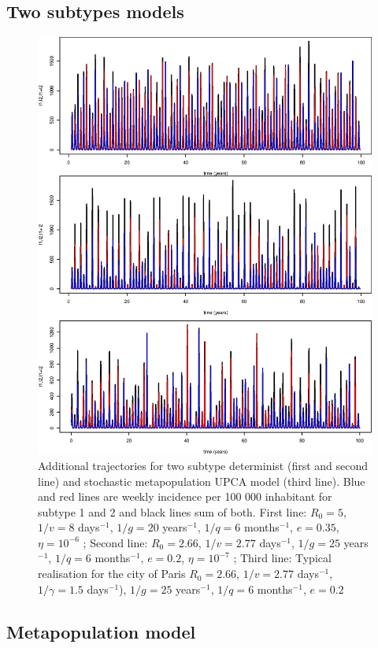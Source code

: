 \documentclass[12pt]{article}
\begin{document}
\clearpage

\subsection{Two subtypes models}

\begin{figure}[htb]
  \center
  \includegraphics[width= 0.8 \linewidth]{graph_annexe/2strain_traj100.eps}
  \caption{Additional trajectories for two subtype determinist
    (first and second line) and stochastic metapopulation UPCA model (third line). Blue and red lines
    are weekly incidence per 100 000 inhabitant for subtype 1 and 2
    and black lines sum of both.
    First line: $R_0=5$, $1/v=8$ days$^{-1}$, $1/g=20$ years$^{-1}$,
    $1/q=6$ months$^{-1}$, $e=0.35$, $\eta=10^{-6}$ ;
    Second line: $R_0=2.66$, $1/v=2.77$ days$^{-1}$, $1/g=25$
    years$^{-1}$, $1/q=6$ months$^{-1}$, $e=0.2$, $\eta=10^{-7}$ ;
    Third line: Typical realisation for the city of Paris $R_0=2.66$, $1/v=2.77$ days$^{-1}$, $1/ \gamma=1.5$
    days$^{-1}$),  $1/g=25$ years$^{-1}$, $1/q=6$ months$^{-1}$, $e=0.2$
  }
  \label{fig:2strain_traj100}
\end{figure}

\clearpage

\subsection{Metapopulation model}
\end{document}
